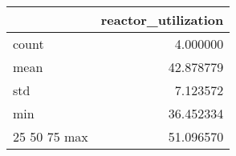\begin{tabular}{lr}
\toprule
 & reactor\_utilization \\
\midrule
count & 4.000000 \\
mean & 42.878779 \\
std & 7.123572 \\
min & 36.452334 \\
25%
50%
75%
max & 51.096570 \\
\bottomrule
\end{tabular}

